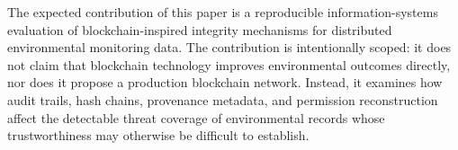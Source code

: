 The expected contribution of this paper is a reproducible information-systems evaluation of blockchain-inspired integrity mechanisms for distributed environmental monitoring data. The contribution is intentionally scoped: it does not claim that blockchain technology improves environmental outcomes directly, nor does it propose a production blockchain network. Instead, it examines how audit trails, hash chains, provenance metadata, and permission reconstruction affect the detectable threat coverage of environmental records whose trustworthiness may otherwise be difficult to establish.
